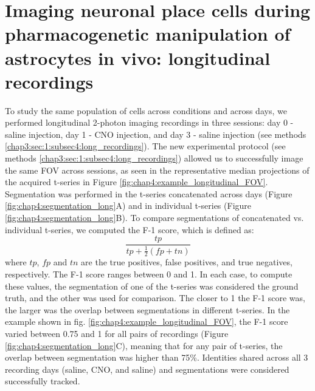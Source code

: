 \section{Imaging neuronal place cells during pharmacogenetic manipulation of astrocytes in vivo: longitudinal recordings}
\label{chap4:sec:4:longitudinal_recordings}
To study the same population of cells across conditions and across days, we performed longitudinal 2-photon imaging recordings in three sessions: day 0 - saline injection, day 1 - CNO injection, and day 3 - saline injection (see methods \ref{chap3:sec:1:subsec4:long_recordings}).
The new experimental protocol (see methods \ref{chap3:sec:1:subsec4:long_recordings}) allowed us to successfully image the same FOV across sessions, as seen in the representative median projections of the acquired t-series in Figure \ref{fig:chap4:example_longitudinal_FOV}.
Segmentation was performed in the t-series concatenated across days (Figure \ref{fig:chap4:segmentation_long}A) and in individual t-series (Figure \ref{fig:chap4:segmentation_long}B).
To compare segmentations of concatenated vs. individual t-series, we computed the F-1 score, which is defined as: 
\begin{equation*}
    \frac{tp}{tp+\frac{1}{2}(fp+tn)}
\end{equation*}
where $tp$, $fp$ and $tn$ are the true positives, false positives, and true negatives, respectively. The F-1 score ranges between 0 and 1.
In each case, to compute these values, the segmentation of one of the t-series was considered the ground truth, and the other was used for comparison. 
The closer to 1 the F-1 score was, the larger was the overlap between segmentations in different t-series.
In the example shown in fig. \ref{fig:chap4:example_longitudinal_FOV}, the F-1 score varied between 0.75 and 1 for all pairs of recordings (Figure \ref{fig:chap4:segmentation_long}C), meaning that for any pair of t-series, the overlap between segmentation was higher than 75\%.
Identities shared across all 3 recording days (saline, CNO, and saline) and segmentations were considered successfully tracked.
